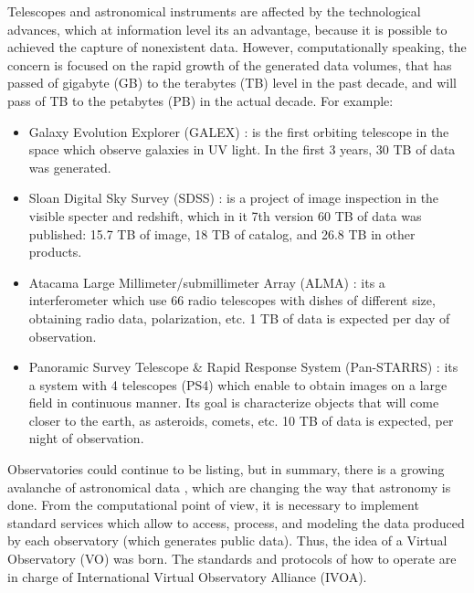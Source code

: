 Telescopes and astronomical instruments are affected by the technological
advances, which at information level its an advantage, because it is possible to
achieved the capture of nonexistent data.
However, computationally speaking, the concern is focused on
the rapid growth of the generated data volumes, that has passed of gigabyte
(GB) to the terabytes (TB) level in the past decade, and will pass of TB to the
petabytes (PB) in the actual decade. For example:
\begin{itemize} \itemsep 0.5pt
	\item Galaxy Evolution Explorer (GALEX) \cite{galex}: is the first
orbiting telescope in the space which observe galaxies in UV light. In the
first 3 years, 30 TB of data was generated.
	\item Sloan Digital Sky Survey (SDSS) \cite{sloan}: is a project of
image inspection in the visible specter and redshift, which in it 7th version
60 TB of data was published: 15.7 TB of image, 18 TB of catalog, and 26.8 TB
in other products.
	\item Atacama Large Millimeter/submillimeter Array (ALMA) \cite{alma}:
its a interferometer which use 66 radio telescopes with dishes of different
size, obtaining radio data, polarization, etc. 1 TB of data is expected per
day of observation.
	\item Panoramic Survey Telescope \& Rapid Response System (Pan-STARRS)
\cite{pan}: its a system with 4 telescopes (PS4) which enable to obtain images
on a large field in continuous manner. Its goal is characterize objects that
will come closer to the earth, as asteroids, comets, etc. 10 TB of data is
expected, per night of observation.
\end{itemize}


Observatories could continue to be listing, but in summary, there is a growing
avalanche of astronomical data \cite{kborne}, which are changing the way that
astronomy is done. From the computational point of view, it is necessary to
implement standard services which allow to access, process, and modeling the
data produced by each observatory (which generates public data). Thus, the idea
of a Virtual Observatory (VO) was born. The standards and protocols of how to
operate are in charge of International Virtual Observatory Alliance (IVOA).

